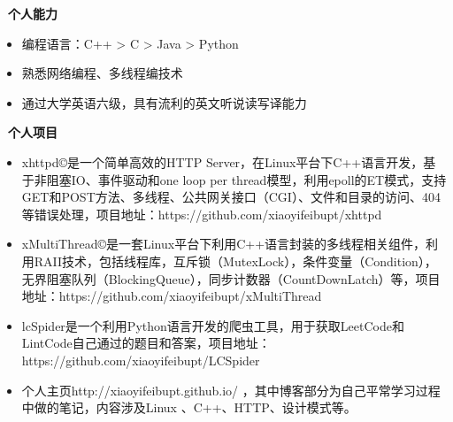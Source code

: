 ﻿\documentclass[UTF8, winfonts]{ctexart}
\begin{document}
\noindent \textbf{ \heiti \faCogs\ 个人能力}
\begin{itemize}
  \setlength{\itemsep}{0pt}
  \setlength{\parsep}{3pt}
  \setlength{\parskip}{3pt}
  \item {}编程语言：C++ > C > Java > Python
  \item {}熟悉网络编程、多线程编技术
  \item {}通过大学英语六级，具有流利的英文听说读写译能力
\end{itemize}
\noindent \textbf{ \heiti \faCode\ 个人项目}
\begin{itemize}
  \setlength{\itemsep}{0pt}
  \setlength{\parsep}{3pt}
  \setlength{\parskip}{3pt}
  \item {}xhttpd©是一个简单高效的HTTP Server，在Linux平台下C++语言开发，基于非阻塞IO、事件驱动和one loop per thread模型，利用epoll的ET模式，支持GET和POST方法、多线程、公共网关接口（CGI）、文件和目录的访问、404等错误处理，项目地址：https://github.com/xiaoyifeibupt/xhttpd
  \item {}xMultiThread©是一套Linux平台下利用C++语言封装的多线程相关组件，利用RAII技术，包括线程库，互斥锁（MutexLock），条件变量（Condition），无界阻塞队列（BlockingQueue），同步计数器（CountDownLatch）等，项目地址：https://github.com/xiaoyifeibupt/xMultiThread
  \item {}lcSpider是一个利用Python语言开发的爬虫工具，用于获取LeetCode和LintCode自己通过的题目和答案，项目地址：https://github.com/xiaoyifeibupt/LCSpider
  \item {}个人主页http://xiaoyifeibupt.github.io/ ，其中博客部分为自己平常学习过程中做的笔记，内容涉及Linux 、C++、HTTP、设计模式等。
\end{itemize}
\end{document}
